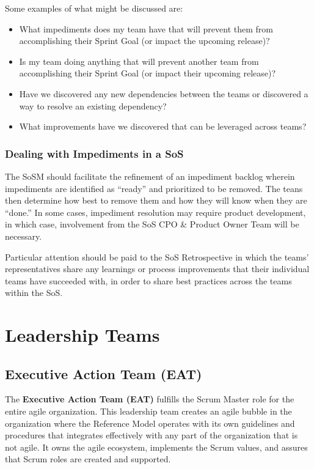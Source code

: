 \documentclass[12pt,a4paper,parskip=full]{scrartcl}
\begin{document}
Some examples of what might be discussed are:
\begin{itemize}
	\item What impediments does my team have that will prevent them from accomplishing their Sprint Goal (or impact the upcoming release)?
	\item Is my team doing anything that will prevent another team from accomplishing their Sprint Goal (or impact their upcoming release)?
	\item Have we discovered any new dependencies between the teams or discovered a way to resolve an existing dependency?
	\item What improvements have we discovered that can be leveraged across teams?
\end{itemize}

\subsubsection{Dealing with Impediments in a SoS}

The SoSM should facilitate the refinement of an impediment backlog wherein impediments are identified as ``ready'' and prioritized to be removed. The teans then determine how best to remove them and how they will know when they are ``done.'' In some cases, impediment resolution may require product development, in which case, involvement from the SoS CPO \& Product Owner Team will be necessary.

Particular attention should be paid to the SoS Retrospective in which the teams' representatives share any learnings or process improvements that their individual teams have succeeded with, in order to share best practices across the teams within the SoS.  


\section{Leadership Teams}

\subsection{Executive Action Team (EAT)}

The \textbf{Executive Action Team (EAT)} fulfills the Scrum Master role for the entire agile organization. This leadership team creates an agile bubble in the organization where the Reference Model operates with its own guidelines and procedures that integrates effectively with any part of the organization that is not agile. It owns the agile ecosystem, implements the Scrum values, and assures that Scrum roles are created and supported.
\end{document}
